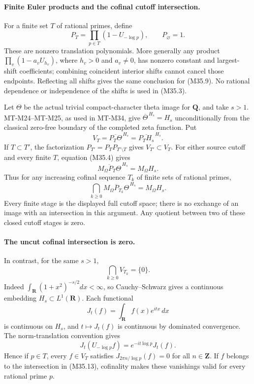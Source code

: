 \paragraph{Finite Euler products and the cofinal cutoff intersection.}
For a finite set $T$ of rational primes, define
\[
                P_T=\prod_{p\in T}(1-U_{-\log p}),
                   \qquad P_\varnothing=1.
 \tag{M35.9}
\]
These are nonzero translation polynomials.  More generally
any product $\prod_v(1-a_vU_{h_v})$, where $h_v>0$ and
$a_v\ne0$, has nonzero constant and largest-shift
coefficients; combining coincident interior shifts cannot
cancel those endpoints.  Reflecting all shifts gives the
same conclusion for (M35.9).  No rational dependence or
independence of the shifts is used in (M35.3).

Let $\Theta$ be the actual trivial compact-character
theta image for $\mathbf Q$, and take $s>1$.
MT-M24--MT-M25, as used in MT-M34, give
$\overline\Theta^{\,H_s}=H_s$ unconditionally from the
classical zero-free boundary of the completed zeta function.
Put
\[
 V_T=\overline{P_T\Theta}^{\,H_s}
                 =\overline{P_TH_s}^{\,H_s}.
 \tag{M35.10}
\]
If $T\subset T'$, the factorization
$P_{T'}=P_TP_{T'\setminus T}$ gives $V_{T'}\subset V_T$.
For either source cutoff and every finite $T$, equation
(M35.4) gives
\[
                  \overline{M_\Omega P_T\Theta}^{\,H_s}
                                  =M_\Omega H_s.
 \tag{M35.11}
\]
Thus for any increasing cofinal sequence $T_k$ of finite
sets of rational primes,
\[
 \bigcap_{k\ge0}
       \overline{M_\Omega P_{T_k}\Theta}^{\,H_s}
                                   =M_\Omega H_s.
 \tag{M35.12}
\]
Every finite stage is the displayed full cutoff space;
there is no exchange of an image with an intersection
in this argument.  Any quotient between two of these
closed cutoff stages is zero.

\paragraph{The uncut cofinal intersection is zero.}
In contrast, for the same $s>1$,
\[
                         \bigcap_{k\ge0}V_{T_k}=\{0\}.
 \tag{M35.13}
\]
Indeed $\int_{\mathbf R}(1+x^2)^{-s/2}dx<\infty$,
so Cauchy--Schwarz gives a continuous embedding
$H_s\subset L^1(\mathbf R)$.  Each functional
\[
                  J_t(f)=\int_{\mathbf R}f(x)e^{itx}\,dx
 \tag{M35.14}
\]
is continuous on $H_s$, and $t\mapsto J_t(f)$ is
continuous by dominated convergence.  The norm-translation
convention gives
\[
       J_t(U_{-\log p}f)=e^{-it\log p}J_t(f).
 \tag{M35.15}
\]
Hence if $p\in T$, every $f\in V_T$ satisfies
$J_{2\pi n/\log p}(f)=0$ for all $n\in\mathbf Z$.
If $f$ belongs to the intersection in (M35.13), cofinality
makes these vanishings valid for every rational prime $p$.

